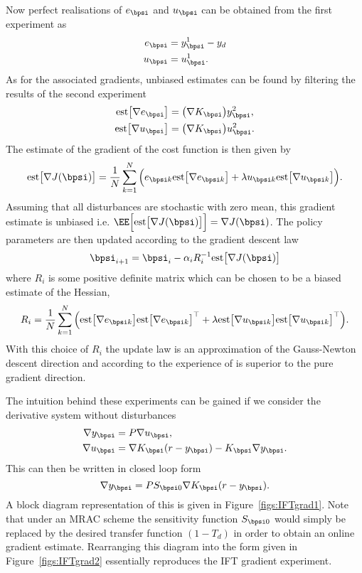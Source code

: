 Now perfect realisations of $e_{\bpsi}$ and $u_{\bpsi}$ can be obtained from the first experiment as
\begin{align}
e_{\bpsi} &= y_{\bpsi}^1 - y_d \\
u_{\bpsi} &= u_{\bpsi}^1.
\end{align}
As for the associated gradients, unbiased estimates can be found by filtering the results of the second experiment
\begin{align}
\mathrm{est} \big[\nabla  e_{\bpsi} \big] &= \big( \nabla  K_{\bpsi} \big) y_{\bpsi}^2, \\
\mathrm{est} \big[\nabla  u_{\bpsi} \big] &= \big( \nabla  K_{\bpsi} \big) u_{\bpsi}^2 .
\end{align}
The estimate of the gradient of the cost function is then given by
\begin{equation}
\mathrm{est} \big[\nabla  J(\bpsi) \big] =\frac{1}{N} \sum_{k=1}^N\Big( 
e_{\bpsi k} \mathrm{est} \big[ \nabla  e_{\bpsi k} \big] 
+ \lambda u_{\bpsi k}  \mathrm{est} \big[\nabla  u_{\bpsi k} \big]
\Big).
\end{equation}
Assuming that all disturbances are stochastic with zero mean, this gradient estimate is unbiased i.e. $\EE\Big[ \mathrm{est} \big[\nabla  J(\bpsi) \big]\Big] = \nabla  J(\bpsi)$. The policy parameters are then updated according to the gradient descent law
\begin{equation}
\bpsi_{i+1} = \bpsi_i - \alpha_i R_i^{-1} \mathrm{est} \big[\nabla  J(\bpsi) \big]
\end{equation}
where $R_i$ is some positive definite matrix which can be chosen to be a biased estimate of the Hessian,
\begin{equation}
R_i =\frac{1}{N} \sum_{k=1}^N\Big( 
\mathrm{est} \big[ \nabla  e_{\bpsi k} \big]  \mathrm{est} \big[ \nabla  e_{\bpsi k} \big]^\top 
+ \lambda \mathrm{est} \big[\nabla  u_{\bpsi k} \big]  \mathrm{est} \big[\nabla  u_{\bpsi k} \big]^\top
\Big).
\end{equation}
With this choice of $R_i$ the update law is an approximation of the Gauss-Newton descent direction and according to the experience of \cite{HGGL98} is superior to the pure gradient direction.



The intuition behind these experiments can be gained if we consider the derivative system without disturbances
\begin{align}
\nabla y_{\bpsi} &= P\nabla u_{\bpsi}, \\
\nabla u_{\bpsi} &= \nabla K_{\bpsi}(r - y_{\bpsi}) - K_{\bpsi}\nabla y_{\bpsi}.
\end{align}
This can then be written in closed loop form 
\begin{equation}
\nabla y_{\bpsi} = PS_{\bpsi 0} \nabla K_{\bpsi} (r-y_{\bpsi}).
\label{eqn:IFTgr}
\end{equation}
A block diagram representation of this is given in Figure~\ref{figs:IFTgrad1}. Note that under an MRAC scheme the sensitivity function $S_{\bpsi 0}$ would simply be replaced by the desired transfer function $(1-T_d)$ in order to obtain an online gradient estimate. Rearranging this diagram into the form given in Figure~\ref{figs:IFTgrad2} essentially reproduces the IFT gradient experiment. 


